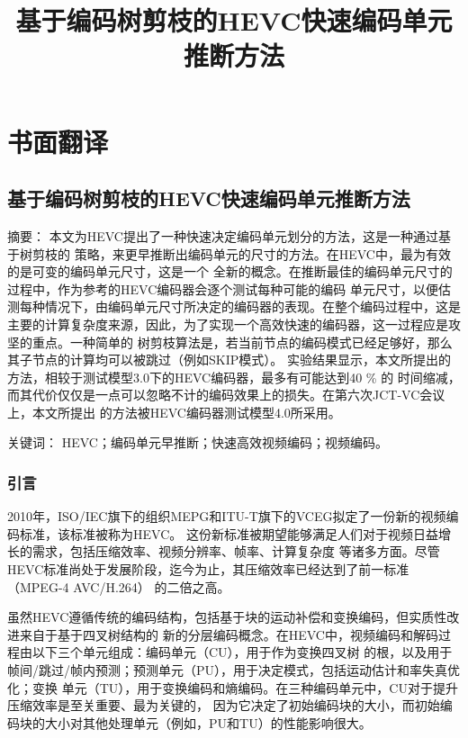 \chapter{书面翻译}

\section{基于编码树剪枝的HEVC快速编码单元推断方法}

\title{基于编码树剪枝的HEVC快速编码单元推断方法}

{\heiti 摘要：} 本文为HEVC提出了一种快速决定编码单元划分的方法，这是一种通过基于树剪枝的
策略，来更早推断出编码单元的尺寸的方法。在HEVC中，最为有效的是可变的编码单元尺寸，这是一个
全新的概念。在推断最佳的编码单元尺寸的过程中，作为参考的HEVC编码器会逐个测试每种可能的编码
单元尺寸，以便估测每种情况下，由编码单元尺寸所决定的编码器的表现。在整个编码过程中，这是
主要的计算复杂度来源，因此，为了实现一个高效快速的编码器，这一过程应是攻坚的重点。一种简单的
树剪枝算法是，若当前节点的编码模式已经足够好，那么其子节点的计算均可以被跳过（例如SKIP模式）。
实验结果显示，本文所提出的方法，相较于测试模型3.0下的HEVC编码器，最多有可能达到40 \% 的
时间缩减，而其代价仅仅是一点可以忽略不计的编码效果上的损失。在第六次JCT-VC会议上，本文所提出
的方法被HEVC编码器测试模型4.0所采用。

{\heiti 关键词：} HEVC；编码单元早推断；快速高效视频编码；视频编码。

\subsection{引言}

2010年，ISO/IEC旗下的组织MEPG和ITU-T旗下的VCEG拟定了一份新的视频编码标准，该标准被称为HEVC。
这份新标准被期望能够满足人们对于视频日益增长的需求，包括压缩效率、视频分辨率、帧率、计算复杂度
等诸多方面。尽管HEVC标准尚处于发展阶段，迄今为止，其压缩效率已经达到了前一标准（MPEG-4 AVC/H.264）
的二倍之高。

虽然HEVC遵循传统的编码结构，包括基于块的运动补偿和变换编码，但实质性改进来自于基于四叉树结构的
新的分层编码概念。在HEVC中，视频编码和解码过程由以下三个单元组成：编码单元（CU），用于作为变换四叉树
的根，以及用于帧间/跳过/帧内预测；预测单元（PU），用于决定模式，包括运动估计和率失真优化；变换
单元（TU），用于变换编码和熵编码。在三种编码单元中，CU对于提升压缩效率是至关重要、最为关键的，
因为它决定了初始编码块的大小，而初始编码块的大小对其他处理单元（例如，PU和TU）的性能影响很大。

